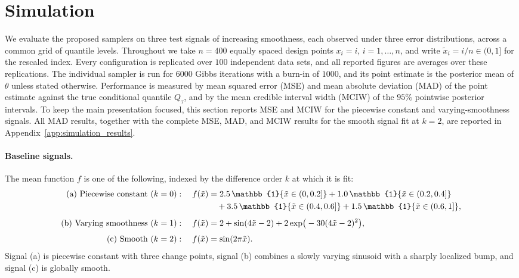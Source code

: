 \section{Simulation}

\label{sec:simulations}

We evaluate the proposed samplers on three test signals of increasing smoothness, each observed under three error distributions, across a common grid of quantile levels. Throughout we take $n = 400$ equally spaced design points $x_i = i$, $i = 1,\dots,n$, and write $\tilde{x}_i = i/n \in (0,1]$ for the rescaled index. Every configuration is replicated over $100$ independent data sets, and all reported figures are averages over these replications. The individual sampler is run for $6000$ Gibbs iterations with a burn-in of $1000$, and its point estimate is the posterior mean of $\theta$ unless stated otherwise. Performance is measured by mean squared error (MSE) and mean absolute deviation (MAD) of the point estimate against the true conditional quantile $Q_\tau$, and by the mean credible interval width (MCIW) of the $95\%$ pointwise posterior intervals. To keep the main presentation focused, this section reports MSE and MCIW for the piecewise constant and varying-smoothness signals. All MAD results, together with the complete MSE, MAD, and MCIW results for the smooth signal fit at $k=2$, are reported in Appendix~\ref{app:simulation_results}.

\paragraph{Baseline signals.} The mean function $f$ is one of the following, indexed by the difference order $k$ at which it is fit:
\begin{align}
\text{(a) Piecewise constant } (k=0):\quad
  f(\tilde{x}) &= 2.5\,\mathbb{1}\{\tilde{x}\in(0,0.2]\} + 1.0\,\mathbb{1}\{\tilde{x}\in(0.2,0.4]\} \notag\\
  &\quad + 3.5\,\mathbb{1}\{\tilde{x}\in(0.4,0.6]\} + 1.5\,\mathbb{1}\{\tilde{x}\in(0.6,1]\}, \\[4pt]
\text{(b) Varying smoothness } (k=1):\quad
  f(\tilde{x}) &= 2 + \sin(4\tilde{x}-2) + 2\exp\!\big(-30(4\tilde{x}-2)^2\big), \\[4pt]
\text{(c) Smooth } (k=2):\quad
  f(\tilde{x}) &= \sin(2\pi\tilde{x}).
\end{align}
Signal (a) is piecewise constant with three change points, signal (b) combines a slowly varying sinusoid with a sharply localized bump, and signal (c) is globally smooth.


